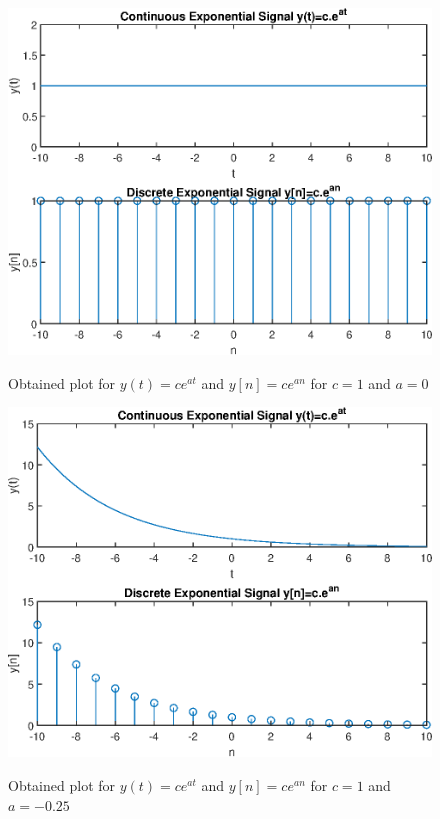 \documentclass{lab_sheet}
\begin{document}
    \begin{figure}[H]
        \centering
        \includegraphics[scale=0.6]{./Figures/exp_signal_2}
        \label{fig:exp2}
        \caption{Obtained plot for $y(t)=ce^{at}$ and $y[n]=ce^{an}$ for $c=1$ and $a=0$}
    \end{figure}

    \begin{figure}[H]
        \centering
        \includegraphics[scale=0.6]{./Figures/exp_signal_3}
        \label{fig:exp3}
        \caption{Obtained plot for $y(t)=ce^{at}$ and $y[n]=ce^{an}$ for $c=1$ and $a=-0.25$}
    \end{figure}
\end{document}

